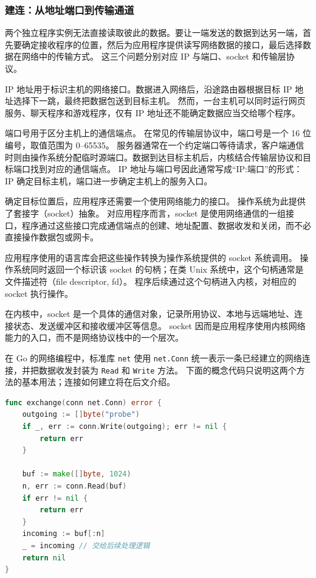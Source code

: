 \subsubsection{建连：从地址端口到传输通道}\label{sec2:connect-channel}

两个独立程序实例无法直接读取彼此的数据。要让一端发送的数据到达另一端，首先要确定接收程序的位置，然后为应用程序提供读写网络数据的接口，最后选择数据在网络中的传输方式。
这三个问题分别对应 IP 与端口、socket 和传输层协议。

IP 地址用于标识主机的网络接口。数据进入网络后，沿途路由器根据目标 IP 地址选择下一跳，最终把数据包送到目标主机。
然而，一台主机可以同时运行网页服务、聊天程序和游戏程序，仅有 IP 地址还不能确定数据应当交给哪个程序。

端口号用于区分主机上的通信端点。
在常见的传输层协议中，端口号是一个 16 位编号，取值范围为 0--65535。
服务器通常在一个约定端口等待请求，客户端通信时则由操作系统分配临时源端口。数据到达目标主机后，内核结合传输层协议和目标端口找到对应的通信端点。
IP 地址与端口号因此通常写成“IP:端口”的形式：IP 确定目标主机，端口进一步确定主机上的服务入口。

确定目标位置后，应用程序还需要一个使用网络能力的接口。
操作系统为此提供了套接字（socket）抽象。
对应用程序而言，socket 是使用网络通信的一组接口，程序通过这些接口完成通信端点的创建、地址配置、数据收发和关闭，而不必直接操作数据包或网卡。

应用程序使用的语言库会把这些操作转换为操作系统提供的 socket 系统调用。
操作系统同时返回一个标识该 socket 的句柄；在类 Unix 系统中，这个句柄通常是文件描述符（file descriptor, fd）。
程序后续通过这个句柄进入内核，对相应的 socket 执行操作。

在内核中，socket 是一个具体的通信对象，记录所用协议、本地与远端地址、连接状态、发送缓冲区和接收缓冲区等信息。
socket 因而是应用程序使用内核网络能力的入口，而不是网络协议栈中的一个层次。

在 Go 的网络编程中，标准库 \texttt{net} 使用 \texttt{net.Conn} 统一表示一条已经建立的网络连接，并把数据收发封装为 \texttt{Read} 和 \texttt{Write} 方法。
下面的概念代码只说明这两个方法的基本用法；连接如何建立将在后文介绍。

\begin{tcolorbox}[title=通过 \texttt{net.Conn} 收发字节（概念示例）]
\begin{lstlisting}[style=codeblock, language=go]
func exchange(conn net.Conn) error {
    outgoing := []byte("probe")
    if _, err := conn.Write(outgoing); err != nil {
        return err
    }

    buf := make([]byte, 1024)
    n, err := conn.Read(buf)
    if err != nil {
        return err
    }
    incoming := buf[:n]
    _ = incoming // 交给后续处理逻辑
    return nil
}
\end{lstlisting}
\end{tcolorbox}

